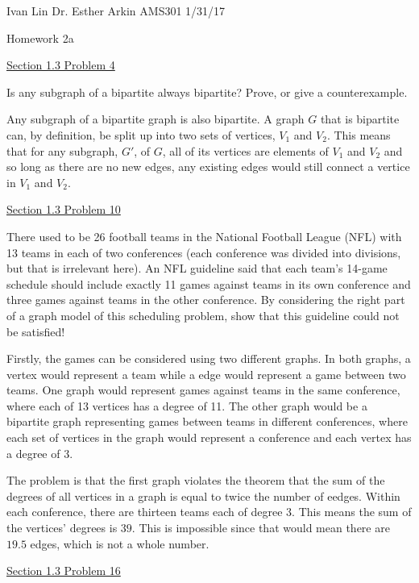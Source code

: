 \documentclass{article}
\begin{document}
Ivan Lin\newline{}
Dr. Esther Arkin\newline{}
AMS301\newline{}
1/31/17

\begin{center}
  Homework 2a
\end{center}

\underline{Section 1.3 Problem 4}

Is any subgraph of a bipartite always bipartite? Prove, or give a counterexample.

Any subgraph of a bipartite graph is also bipartite. A graph $G$ that is bipartite can, by definition, be split up into two sets of vertices, $V_1$ and $V_2$. This means that for any subgraph, $G'$, of $G$, all of its vertices are elements of $V_1$ and $V_2$ and so long as there are no new edges, any existing edges would still connect a vertice in $V_1$ and $V_2$.

\underline{Section 1.3 Problem 10}

There used to be 26 football teams in the National Football League (NFL) with 13 teams in each of two conferences (each conference was divided into divisions, but that is irrelevant here). An NFL guideline said that each team’s 14-game schedule should include exactly 11 games against teams in its own conference and three games against teams in the other conference. By considering the right part of a graph model of this scheduling problem, show that this guideline could not be satisfied!

Firstly, the games can be considered using two different graphs. In both graphs, a vertex would represent a team while a edge would represent a game between two teams. One graph would represent games against teams in the same conference, where each of 13 vertices has a degree of 11. The other graph would be a bipartite graph representing games between teams in different conferences, where each set of vertices in the graph would represent a conference and each vertex has a degree of 3.

The problem is that the first graph violates the theorem that the sum of the degrees of all vertices in a graph is equal to twice the number of eedges. Within each conference, there are thirteen teams each of degree 3. This means the sum of the vertices' degrees is $39$. This is impossible since that would mean there are $19.5$ edges, which is not a whole number.

\underline{Section 1.3 Problem 16}
\end{document}
